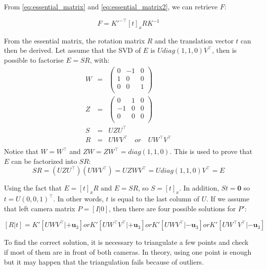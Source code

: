 \documentclass[11pt]{report}
\begin{document}
From \ref{eq:essential_matrix} and \ref{eq:essential_matrix2}, we can retrieve $F$:

\begin{equation}
  F = K'^{-\top} [t]_x R K^{-1}
\label{eq:fundamental_matrix}
\end{equation}

From the essential matrix, the rotation matrix $R$ and the translation vector $t$ can then be derived. Let assume that the SVD of $E$ is $Udiag(1, 1, 0)V^\top$, then is possible to factorise $E = SR$, with:
\[
\left .
  \begin{array}{ccl}
        W & = & \left (
                \begin{matrix}
	                0 & -1 & 0 \\
	                1 & 0 & 0 \\
	                0 & 0 & 1 \\
                \end{matrix}
                \right ) \\
        Z & = & \left (
                \begin{matrix}
	                0 & 1 & 0\\
	                -1 & 0 & 0\\
	                0 & 0 & 0 \\
                \end{matrix}
                \right ) \\
        S & = & UZU^\top \\
        R & = & UWV^\top \quad or\quad UW^\top V^\top \\
  \end{array}
\right.
\]
Notice that $W = W^\top$ and $ZW = ZW^\top = diag(1, 1, 0)$. This is used to prove that $E$ can be factorized into $SR$: 
\[
    SR = (UZU^\top)(UWV^\top) = UZWV^\top = Udiag(1, 1, 0)V^\top = E
\]

Using the fact that $E =[t]_x R$ and $E = SR$, so $S=[t]_x$. In addition, $St = \mathbf{0}$ so $t = U(0, 0, 1)^\top$. In other words, $t$ is equal to the last column of $U$. If we assume that left camera matrix $P = [I|0]$, then there are four possible solutions for $P'$:

\[
    [R|t] = K'[UWV^\top | +\mathbf{u}_3] or K'[UW^\top V^\top | +\mathbf{u}_3] or K'[UWV^\top | -\mathbf{u}_3] or  K'[UW^\top V^\top | -\mathbf{u}_3]
\]

To find the correct solution, it is necessary to triangulate a few points and check if most of them are in front of both cameras. In theory, using one point is enough but it may happen that the triangulation fails because of outliers.
\end{document}
